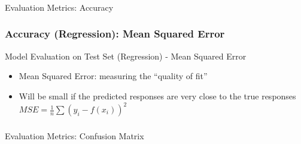 \begin{frame}[fragile]\frametitle{}
\begin{center}
{\Large Evaluation Metrics: Accuracy}
\end{center}
\end{frame}

\begin{frame}[fragile]\frametitle{Accuracy (Regression): Mean Squared Error}
Model Evaluation on Test Set (Regression) - Mean Squared Error
\begin{itemize}
\item Mean Squared Error: measuring the ``quality of fit''
\item Will be small if the predicted responses are very close to the true responses
$MSE = \frac{1}{n} \sum (y_i - f(x_i))^2$
\end{itemize}
\end{frame}




\begin{frame}[fragile]\frametitle{}
\begin{center}
{\Large Evaluation Metrics: Confusion Matrix}
\end{center}
\end{frame}


